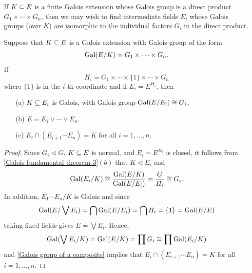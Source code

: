 If $K\subseteq E$ is a finite Galois extension whose Galois group is a direct product $G_1\times\cdots\times G_n$, then we may wish to find intermediate fields $E_i$ whose Galois groups (over $K$) are isomorphic to the individual factors $G_i$ in the direct product.
\begin{corollary}\label{Galois group is a product}
Suppose that $K\subseteq E$ is a Galois extension with Galois group of the form
\[\mathrm{Gal}(E/K)=G_1\times\cdots\times G_n.\]
If
\[H_i=G_1\times\cdots\times\{1\}\times\cdots\times G_n\]
where $\{1\}$ is in the $i$-th coordinate and if $E_i=E^{H_i}$, then
\begin{itemize}
\item[(a)] $K\subseteq E_i$ is Galois, with Galois group $\mathrm{Gal}(E/E_i)\cong G_i$.
\item[(b)] $E=E_1\vee\cdots\vee E_n$.
\item[(c)] $E_i\cap(E_{i+1}\cdots E_n)=K$ for all $i=1,\dots,n$.
\end{itemize}
\end{corollary}
\begin{proof}
Since $G_i\lhd G$, $K\subseteq E$ is normal, and $E_i=E^{H_i}$ is closed, it follows from \cref{Galois fundamental theorem-3}$(b)$ that $K\lhd E_i$ and
\[\mathrm{Gal}(E_i/K)\cong\frac{\mathrm{Gal}(E/K)}{\mathrm{Gal}(E/E_i)}=\frac{G}{H_i}\cong G_i.\]
In addition, $E_1\cdots E_n/K$ is Galois and since
\[\mathrm{Gal}(E/\bigvee E_i)=\bigcap\mathrm{Gal}(E/E_i)=\bigcap H_i=\{1\}=\mathrm{Gal}(E/E)\]
taking fixed fields gives $E=\bigvee E_i$. Hence,
\[\mathrm{Gal}(\bigvee E_i/K)=\mathrm{Gal}(E/K)=\prod G_i\cong\prod\mathrm{Gal}(E_i/K)\]
and \cref{Galois group of a composite} implies that $E_i\cap(E_{i+1}\cdots E_n)=K$ for all $i=1,\dots,n$.
\end{proof}
